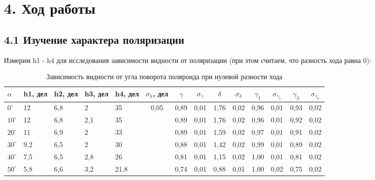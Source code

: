 \documentclass[a4paper,12pt]{report}
\begin{document}
\section*{4. Ход работы}
\subsection*{4.1 Изучение характера поляризации}
Измерим h1 - h4 для исследования зависимости видности от поляризации (при этом считаем, что разность хода равна 0):
\begin{table}[H]
\begin{center}
\caption{Зависимость видности от угла поворота поляроида при нулевой разности хода}
\begin{tabular}{|p{0.39cm}|p{0.6cm}|p{0.6cm}|p{0.6cm}|p{0.6cm}|c|c|c|c|c|c|c|c|c|}
\hline
$\alpha$ & h1, дел & h2, дел & h3, дел & h4, дел & $\sigma_h$, дел           & $\gamma$ & $\sigma_{\gamma}$ & $\delta$ & $\sigma_{\delta}$ & $\gamma_{1}$ & $\sigma_\gamma_{1}$ & $\gamma_{3}$ & $\sigma_{\gamma_{3}}$ \\ \hline
$0^{\circ}$     & 12      & 6,8     & 2       & 35      & \multirow{10}{*}{0,05} & 0,89  & 0,01        & 1,76  & 0,02        & 0,96         & 0,01               & 0,93         & 0,02               \\ \cline{1-5} \cline{7-14} 
$10^{\circ}$    & 12      & 6,8     & 2,1     & 35      &                        & 0,89  & 0,01        & 1,76  & 0,02        & 0,96         & 0,01               & 0,92         & 0,02               \\ \cline{1-5} \cline{7-14} 
$20^{\circ}$    & 11      & 6,9     & 2       & 33      &                        & 0,89  & 0,01        & 1,59  & 0,02        & 0,97         & 0,01               & 0,91         & 0,02               \\ \cline{1-5} \cline{7-14} 
$30^{\circ}$    & 9,2     & 6,5     & 2       & 30      &                        & 0,88  & 0,01        & 1,42  & 0,02        & 0,99         & 0,01               & 0,89         & 0,02               \\ \cline{1-5} \cline{7-14} 
$40^{\circ}$    & 7,5     & 6,5     & 2,8     & 26      &                        & 0,81  & 0,01        & 1,15  & 0,02        & 1,00         & 0,01               & 0,81         & 0,02               \\ \cline{1-5} \cline{7-14} 
$50^{\circ}$    & 5,8     & 6,6     & 3,2     & 21,8    &                        & 0,74  & 0,01        & 0,88  & 0,01        & 1,00         & 0,02               & 0,75         & 0,02               \\ \cline{1-5} \cline{7-14} 

\end{tabular}
\end{center}
\end{table}
\end{document}
